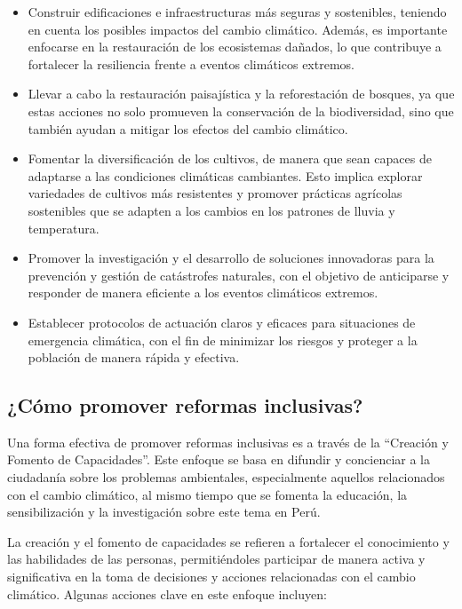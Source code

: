 \documentclass[
  stu,
  floatsintext,
  longtable,
  a4paper,
  nolmodern,
  notxfonts,
  notimes,
  12pt,
  colorlinks=true,linkcolor=blue,citecolor=blue,urlcolor=blue]{apa7}
\providecommand{\tightlist}{%
  \setlength{\itemsep}{0pt}\setlength{\parskip}{0pt}}
\begin{document}
\begin{itemize}
\tightlist
\item
  Construir edificaciones e infraestructuras más seguras y sostenibles,
  teniendo en cuenta los posibles impactos del cambio climático. Además,
  es importante enfocarse en la restauración de los ecosistemas dañados,
  lo que contribuye a fortalecer la resiliencia frente a eventos
  climáticos extremos.
\item
  Llevar a cabo la restauración paisajística y la reforestación de
  bosques, ya que estas acciones no solo promueven la conservación de la
  biodiversidad, sino que también ayudan a mitigar los efectos del
  cambio climático.
\item
  Fomentar la diversificación de los cultivos, de manera que sean
  capaces de adaptarse a las condiciones climáticas cambiantes. Esto
  implica explorar variedades de cultivos más resistentes y promover
  prácticas agrícolas sostenibles que se adapten a los cambios en los
  patrones de lluvia y temperatura.
\item
  Promover la investigación y el desarrollo de soluciones innovadoras
  para la prevención y gestión de catástrofes naturales, con el objetivo
  de anticiparse y responder de manera eficiente a los eventos
  climáticos extremos.
\item
  Establecer protocolos de actuación claros y eficaces para situaciones
  de emergencia climática, con el fin de minimizar los riesgos y
  proteger a la población de manera rápida y efectiva.
\end{itemize}

\subsection{¿Cómo promover reformas
inclusivas?}\label{cuxf3mo-promover-reformas-inclusivas}

Una forma efectiva de promover reformas inclusivas es a través de la
``Creación y Fomento de Capacidades''. Este enfoque se basa en difundir
y concienciar a la ciudadanía sobre los problemas ambientales,
especialmente aquellos relacionados con el cambio climático, al mismo
tiempo que se fomenta la educación, la sensibilización y la
investigación sobre este tema en Perú.

La creación y el fomento de capacidades se refieren a fortalecer el
conocimiento y las habilidades de las personas, permitiéndoles
participar de manera activa y significativa en la toma de decisiones y
acciones relacionadas con el cambio climático. Algunas acciones clave en
este enfoque incluyen:
\end{document}
